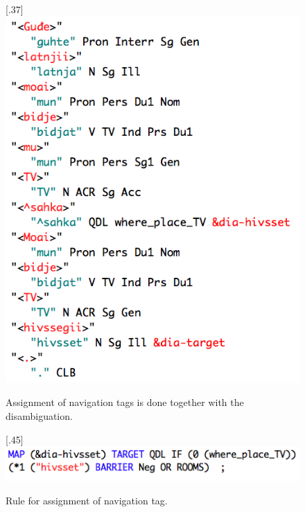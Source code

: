 \documentclass[11pt]{article}
\begin{document}
\begin{figure}[htbp]
\begin{center}
\scalebox{.37}[.37]{\includegraphics{presentation/img/hivssegiiCGanalEng.png}}\\
\caption{Assignment of navigation tags is done together with the disambiguation.}
\label{hivssetanalysis}
\end{center}
\end{figure}

\begin{figure}[htbp]
\begin{center}
\scalebox{.45}[.45]{\includegraphics{presentation/img/hivssetrule.png}}\\
\caption{Rule for assignment of navigation tag.}
\label{hivssettag}
\end{center}
\end{figure}
\end{document}
